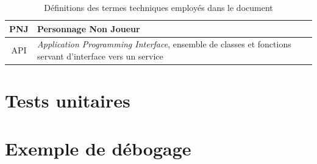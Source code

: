 \documentclass[a4paper,12pt]{article}
\begin{document}
\begin{table}[h]
    \centering
    \begin{tabular}{c p{}}
	\toprule
	PNJ		    & Personnage Non Joueur \\
	\midrule
	API \label{def_api} & \textit{Application Programming Interface}, ensemble de classes et fonctions servant d’interface vers un service \\
	\bottomrule
    \end{tabular}
    \caption{Définitions des termes techniques employés dans le document}
\end{table}



\section{Tests unitaires}
\section{Exemple de débogage}

\end{document}
